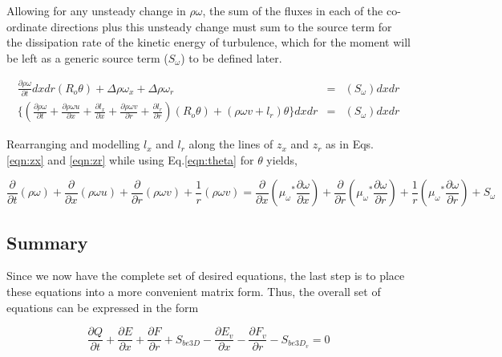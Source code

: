 	Allowing for any unsteady change in $\rho \omega$, the sum of the fluxes in 
each of the co-ordinate directions plus this unsteady change must sum to the source term for the dissipation rate of the 
kinetic energy of turbulence, which for the moment will be left as a generic source term ($S_\omega$) to be defined later.

\begin{displaymath}
	\begin{array}{ccc}
	\frac{\partial \rho \omega}{\partial t}dxdr(R_o \theta) + \Delta \rho \omega_x + \Delta \rho \omega_r & = 
	& (S_\omega)dxdr \\
	\Big\{(\frac{\partial \rho \omega}{\partial t} + \frac{\partial \rho \omega u}{\partial x} 
	+ \frac{\partial l_x}{\partial x}
	+  \frac{\partial \rho \omega v}{\partial r} + \frac{\partial l_r}{\partial r})(R_o \theta) + 
	(\rho \omega v + l_r)\theta \Big\}dxdr & = & (S_\omega)dxdr
	\end{array}
\end{displaymath}

	Rearranging and modelling $l_x$ and $l_r$ along the lines of $z_x$ and $z_r$ as in Eqs.\ref{eqn:zx} 
and \ref{eqn:zr} while using Eq.\ref{eqn:theta} for $\theta$ yields,

\begin{equation}
	\frac{\partial}{\partial t}(\rho \omega) + \frac{\partial}{\partial x}(\rho \omega u) 
	+ \frac{\partial}{\partial r}(\rho \omega v)
	+ \frac {1}{r}(\rho \omega v) = \frac{\partial}{\partial x}({\mu_\omega}^* \frac{\partial \omega}{\partial x}) 
	+ \frac{\partial}{\partial r}({\mu_\omega}^* \frac{\partial \omega}{\partial r}) 
	+ \frac {1}{r}({\mu_\omega}^* \frac{\partial \omega}{\partial r}) + S_\omega
\label{eqn:dissipationfinal}
\end{equation}

\subsection{Summary}

	Since we now have the complete set of desired equations, the last step is to place these equations into a 
more convenient matrix form.  Thus, the overall set of equations can be expressed in the form

\begin{equation}
	\frac{\partial Q}{\partial t} + \frac{\partial E}{\partial x} + \frac{\partial F}{\partial r} + S_{be3D}
	-\frac{\partial E_v}{\partial x} - \frac{\partial F_v}{\partial r} - S_{be3D_v} = 0
\label{eqn:final}
\end{equation}

